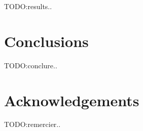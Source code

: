 \documentclass{article}
\begin{document}
TODO:results..


\section{Conclusions}
\label{sec:conclusions}

TODO:conclure..



\section{Acknowledgements}
\label{sec:conclusions}

TODO:remercier..





\end{document}
